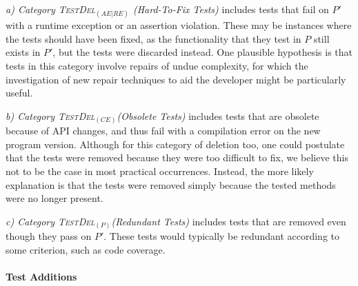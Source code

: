 \documentclass[conference]{IEEEtran}
\newcommand{\lang}[1]{\texttt{\small #1}}
\newcommand{\subject}[1]{\texttt{\small #1}}
\newcommand{\mt}{\mathit}
\newcommand{\catdelaere}{\textsc{TestDel}$_\mt{(AE|RE)}$}
\newcommand{\catdelce}{\textsc{TestDel}$_\mt{(CE)}$}
\newcommand{\catdelp}{\textsc{TestDel}$_\mt{(P)}$}
\begin{document}
\textit{a) Category \catdelaere{} (Hard-To-Fix Tests)} includes tests
that fail on $P'$ with a runtime exception or an assertion
violation. These may be instances where the tests should have been
fixed, as the functionality that they test in $P$ still exists in
$P'$, but the tests were discarded instead. One plausible hypothesis
is that tests in this category involve repairs of undue complexity,
for which the investigation of new repair techniques to aid the
developer might be particularly useful.

\textit{b) Category \catdelce (Obsolete Tests)} includes tests that
are obsolete because of API changes, and thus fail with a compilation
error on the new program version.
%
%
%
Although for this category of deletion too, one could postulate that
the tests were removed because they were too difficult to fix, we
believe this not to be the case in most practical occurrences.
Instead, the more likely explanation is that the tests were removed
simply because the tested methods were no longer present.

\textit{c) Category \catdelp (Redundant Tests)} includes tests that
are removed even though they pass on $P'$. These tests would typically
be redundant according to some criterion, such as code coverage.

\paragraph*{\textbf{Test Additions}}
\label{sec:test-add}
\end{document}
